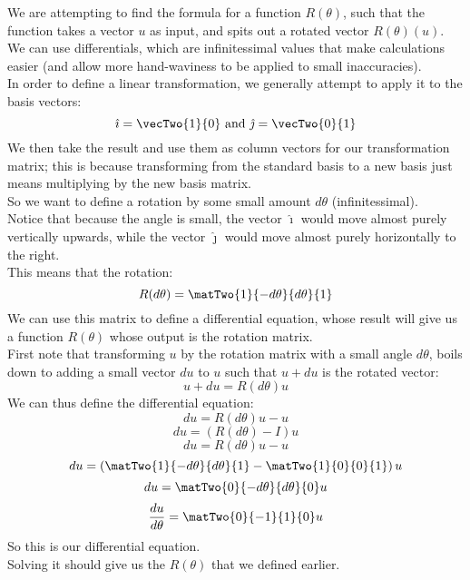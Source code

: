 \documentclass[12pt]{article}
\begin{document}
We are attempting to find the formula
for a function $R(\theta)$,
such that the function takes
a vector $u$ as input,
and spits out a rotated vector $R(\theta)(u)$. \\
We can use differentials, which are infinitessimal
values that make calculations easier
(and allow more hand-waviness to be applied
to small inaccuracies). \\

In order to define a linear transformation,
we generally attempt to apply it to
the basis vectors:
\[ \hat{\imath}  = \vecTwo{1}{0} \AND 
\hat{\jmath} = \vecTwo{0}{1} \]
We then take the result and use them
as column vectors for our transformation
matrix; this is because transforming
from the standard basis to a new basis
just means multiplying by the new basis
matrix. \\

So we want to define a rotation by some
small amount $d\theta$ (infinitessimal). \\
Notice that because the angle is small,
the vector $\hat{\imath}$ would move almost
purely vertically upwards,
while the vector $\hat{\jmath}$
would move almost purely horizontally
to the right. \\
This means that the rotation:
\[ R(d\theta) 
= \matTwo{1}{-d\theta}{d\theta}{1} \]
We can use this matrix to define
a differential equation,
whose result will give us a function
$R(\theta)$ whose output is
the rotation matrix. \\

First note that transforming $u$
by the rotation matrix with a small angle $d\theta$,
boils down to adding a small vector $du$
to $u$ such that $u + du$
is the rotated vector:
\[ u + du = R(d\theta)u  \]
We can thus define the differential equation:
\[ du = R(d\theta)u - u \]
\[ du = (R(d\theta) - I)u \]
\[ du = R(d\theta)u - u \]
\[ du = \para{\matTwo{1}{-d\theta}{d\theta}{1}
- \matTwo{1}{0}{0}{1}}u \]
\[ du = \matTwo{0}{-d\theta}{d\theta}{0}u \]
\[ \dfrac{du}{d\theta} 
= \matTwo{0}{-1}{1}{0}u \]
So this is our differential equation. \\
Solving it should give us the $R(\theta)$
that we defined earlier. \\
\end{document}
